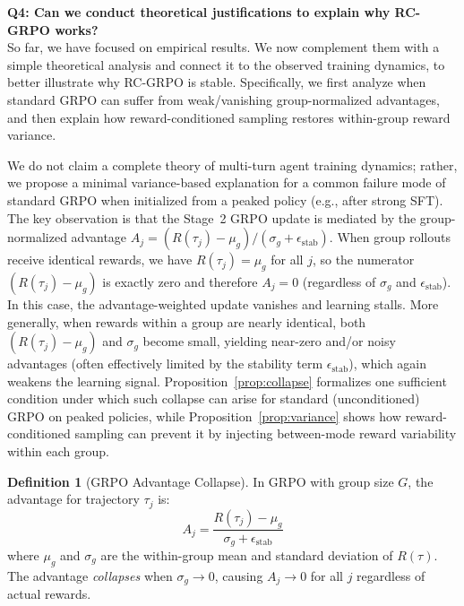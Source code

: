 \documentclass{article}
\theoremstyle{plain}
\theoremstyle{definition}
\newtheorem{definition}[theorem]{Definition}
\theoremstyle{remark}
\begin{document}
\textbf{Q4: Can we conduct theoretical justifications to explain why RC-GRPO works?} \\
\label{q4}
So far, we have focused on empirical results. We now complement them with a simple theoretical analysis and connect it to the observed training dynamics, to better illustrate why RC-GRPO is stable.
Specifically, we first analyze when standard GRPO can suffer from weak/vanishing group-normalized advantages, and then explain how reward-conditioned sampling restores within-group reward variance.

\label{sec:theory}
We do not claim a complete theory of multi-turn agent training dynamics; rather, we propose a minimal variance-based explanation for a common failure mode of standard GRPO when initialized from a peaked policy (e.g., after strong SFT). The key observation is that the Stage~2 GRPO update is mediated by the group-normalized advantage
$A_j = (R(\tau_j)-\mu_g)/(\sigma_g+\epsilon_{\text{stab}})$.
When group rollouts receive identical rewards, we have $R(\tau_j)=\mu_g$ for all $j$, so the numerator $(R(\tau_j)-\mu_g)$ is exactly zero and therefore $A_j=0$ (regardless of $\sigma_g$ and $\epsilon_{\text{stab}}$). In this case, the advantage-weighted update vanishes and learning stalls.
More generally, when rewards within a group are nearly identical, both $(R(\tau_j)-\mu_g)$ and $\sigma_g$ become small, yielding near-zero and/or noisy advantages (often effectively limited by the stability term $\epsilon_{\text{stab}}$), which again weakens the learning signal.
Proposition~\ref{prop:collapse} formalizes one sufficient condition under which such collapse can arise for standard (unconditioned) GRPO on peaked policies, while Proposition~\ref{prop:variance} shows how reward-conditioned sampling can prevent it by injecting between-mode reward variability within each group.

\begin{definition}[GRPO Advantage Collapse]
In GRPO with group size $G$, the advantage for trajectory $\tau_j$ is:
\begin{equation}
A_j = \frac{R(\tau_j) - \mu_g}{\sigma_g + \epsilon_{\text{stab}}}
\end{equation}
where $\mu_g$ and $\sigma_g$ are the within-group mean and standard deviation of $R(\tau)$. The advantage \emph{collapses} when $\sigma_g \to 0$, causing $A_j \to 0$ for all $j$ regardless of actual rewards.
\end{definition}
\end{document}
